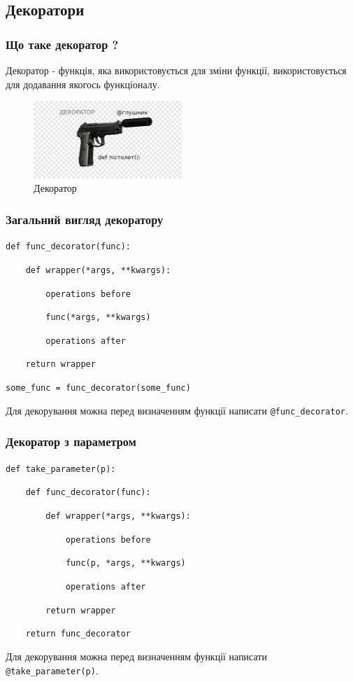 \subsection{Декоратори} 
\begin{frame}
\frametitle{Що таке декоратор ?}
Декоратор - функція, яка використовується для зміни функції, використовується для додавання якогось функціоналу.

\begin{figure}
  \begin{center}
    \includegraphics[width=0.5\textwidth,height=0.5\textheight]{pictures/decorator.png}
  \caption{Декоратор}
\label{function}
  \end{center}
\end{figure}


\end{frame}

\begin{frame}
\frametitle{Загальний вигляд декоратору}

\texttt{def func\_decorator(func):}

\texttt{~~~~def wrapper(*args, **kwargs):}

\texttt{~~~~~~~~operations before}

\texttt{~~~~~~~~func(*args, **kwargs)}

\texttt{~~~~~~~~operations after}

\texttt{~~~~return wrapper}

\texttt{some\_func = func\_decorator(some\_func)}

Для декорування можна перед визначенням функції написати \texttt{@func\_decorator}.
\end{frame}

\begin{frame}
\frametitle{Декоратор з параметром}

\texttt{def take\_parameter(p):}

\texttt{~~~~def func\_decorator(func):}

\texttt{~~~~~~~~def wrapper(*args, **kwargs):}

\texttt{~~~~~~~~~~~~operations before}

\texttt{~~~~~~~~~~~~func(p, *args, **kwargs)}

\texttt{~~~~~~~~~~~~operations after}

\texttt{~~~~~~~~return wrapper}

\texttt{~~~~return func\_decorator}

Для декорування можна перед визначенням функції написати \texttt{@take\_parameter(p)}.
\end{frame}
